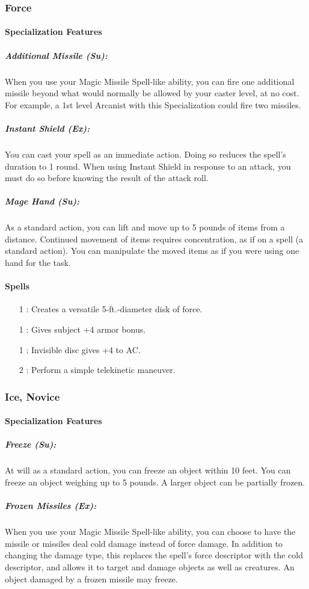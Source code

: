 \subsubsection{Force}
\paragraph{Specialization Features}
\subparagraph{Additional Missile (Su):} When you use your Magic Missile Spell-like ability, you can fire one additional missile beyond what would normally be allowed by your caster level, at no cost. For example, a 1st level Arcanist with this Specialization could fire two missiles.
\subparagraph{Instant Shield (Ex):} You can cast your  spell as an immediate action. Doing so reduces the spell's duration to 1 round. When using Instant Shield in response to an attack, you must do so before knowing the result of the attack roll.
\subparagraph{Mage Hand (Su):} As a standard action, you can lift and move up to 5 pounds of items from a distance. Continued movement of items requires concentration, as if on a spell (a standard action). You can manipulate the moved items as if you were using one hand for the task.
\paragraph{Spells}
\begin{itemize}
 \item[1] : Creates a versatile 5-ft.-diameter disk of force.
 \item[1] : Gives subject +4 armor bonus.
 \item[1] : Invisible disc gives +4 to AC.
 \item[2] : Perform a simple telekinetic maneuver.
\end{itemize}

\subsubsection{Ice, Novice}
\label{Spec:IceNovice}
\paragraph{Specialization Features}
\subparagraph{Freeze (Su):} At will as a standard action, you can freeze an object within 10 feet. You can freeze an object weighing up to 5 pounds. A larger object can be partially frozen.
\subparagraph{Frozen Missiles (Ex):} When you use your Magic Missile Spell-like ability, you can choose to have the missile or missiles deal cold damage instead of force damage. In addition to changing the damage type, this replaces the spell's force descriptor with the cold descriptor, and allows it to target and damage objects as well as creatures. An object damaged by a frozen missile may freeze.
